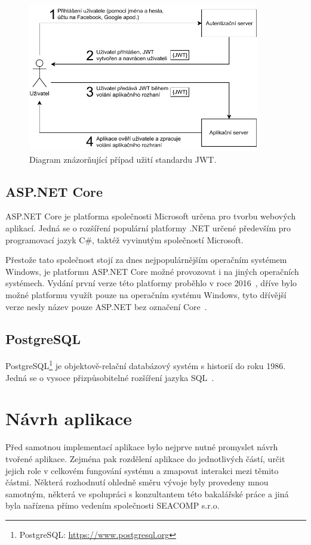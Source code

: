 \begin{figure}[H]
    \label{img:jwt}
	\centering
	\includegraphics[width=0.9\textwidth]{obrazky-figures/jwt.pdf}
	\caption{Diagram znázorňující případ užití standardu JWT.}
\end{figure}

\section{ASP.NET Core}
ASP.NET Core je platforma společnosti Microsoft určena pro tvorbu webových aplikací. Jedná se o rozšíření populární platformy .NET určené především pro programovací jazyk C\#, taktéž vyvinutým společností Microsoft.

Přestože tato společnost stojí za dnes nejpopulárnějším operačním systémem Windows, je platformu ASP.NET Core možné provozovat i na jiných operačních systémech. Vydání první verze této platformy proběhlo v roce 2016~\cite{bib:asp-release}, dříve bylo možné platformu využít pouze na operačním systému Windows, tyto dřívější verze nesly název pouze ASP.NET bez označení Core~\cite{bib:asp-what-is}.

\blindtext

\section{PostgreSQL}
PostgreSQL\footnote{PostgreSQL: \url{https://www.postgresql.org}} je objektově-relační databázový systém s historií do roku 1986. Jedná se o vysoce přizpůsobitelné rozšíření jazyka SQL~\cite{bib:postgre}.
\blindtext



\chapter{Návrh aplikace}
Před samotnou implementací aplikace bylo nejprve nutné promyslet návrh tvořené aplikace. Zejména pak rozdělení aplikace do jednotlivých částí, určit jejich role v celkovém fungování systému a zmapovat interakci mezi těmito částmi. Některá rozhodnutí ohledně směru vývoje byly provedeny mnou samotným, některá ve spolupráci s konzultantem této bakalářské práce a jiná byla nařízena přímo vedením společnosti SEACOMP s.r.o.

